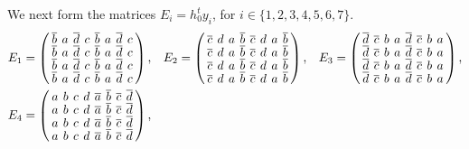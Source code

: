 \documentclass[../../main]{subfiles}
\begin{document}
We next form the matrices $E_i = h_0^ty_i$, for $i \in \{1,2,3,4,5,6,7\}$.
\begin{align*}
  E_1 &= \left(
        \arraycolsep=2.0pt\def\arraystretch{0.5}
        \begin{array}{cccccccc}
          \bar{b}&a&\bar{d}&c&\bar{b}&a&\bar{d}&c\\
          \bar{b}&a&\bar{d}&c&\bar{b}&a&\bar{d}&c\\
          \bar{b}&a&\bar{d}&c&\bar{b}&a&\bar{d}&c\\
          \bar{b}&a&\bar{d}&c&\bar{b}&a&\bar{d}&c\\
        \end{array}
        \right),
      &
        E_2 &= \left(
              \arraycolsep=2.0pt\def\arraystretch{0.5}
              \begin{array}{cccccccc}
                \bar{c}&d&a&\bar{b}&\bar{c}&d&a&\bar{b}\\
                \bar{c}&d&a&\bar{b}&\bar{c}&d&a&\bar{b}\\
                \bar{c}&d&a&\bar{b}&\bar{c}&d&a&\bar{b}\\
                \bar{c}&d&a&\bar{b}&\bar{c}&d&a&\bar{b}\\
              \end{array}
              \right),
      &
        E_3 &= \left(
              \arraycolsep=2.0pt\def\arraystretch{0.5}
              \begin{array}{cccccccc}
                \bar{d}&\bar{c}&b&a&\bar{d}&\bar{c}&b&a\\
                \bar{d}&\bar{c}&b&a&\bar{d}&\bar{c}&b&a\\
                \bar{d}&\bar{c}&b&a&\bar{d}&\bar{c}&b&a\\
                \bar{d}&\bar{c}&b&a&\bar{d}&\bar{c}&b&a\\
              \end{array}
  \right),
  \\
  E_4 &= \left(
        \arraycolsep=2.0pt\def\arraystretch{0.5}
        \begin{array}{cccccccc}
          a&b&c&d&\bar{a}&\bar{b}&\bar{c}&\bar{d}\\
          a&b&c&d&\bar{a}&\bar{b}&\bar{c}&\bar{d}\\
          a&b&c&d&\bar{a}&\bar{b}&\bar{c}&\bar{d}\\
          a&b&c&d&\bar{a}&\bar{b}&\bar{c}&\bar{d}\\
        \end{array}
  \right),

\end{align*}
\end{document}
